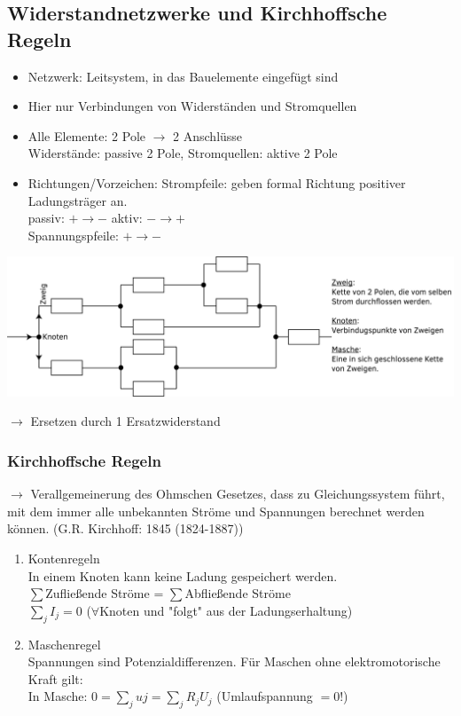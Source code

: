 \documentclass[11pt]{article}
\begin{document}
	\subsection{Widerstandnetzwerke und Kirchhoffsche Regeln}
	
	\begin{itemize}
		\item Netzwerk: Leitsystem, in das Bauelemente eingefügt sind
		\item Hier nur Verbindungen von Widerständen und Stromquellen
		\item Alle Elemente: 2 Pole $ \longrightarrow $ 2 Anschlüsse \\
		Widerstände: passive 2 Pole, Stromquellen: aktive 2 Pole
		\item Richtungen/Vorzeichen: Strompfeile: geben formal Richtung positiver Ladungsträger an. \\
		passiv: $ + \longrightarrow - $ \hspace{1cm} aktiv: $ - \longrightarrow + $ \\
		Spannungspfeile: $ + \longrightarrow - $
	\end{itemize}
	\begin{center}
		\includegraphics[width=1\linewidth]{skizzen/15/15_4-6/15_5B0}
	\end{center}

	$ \longrightarrow $ Ersetzen durch 1 Ersatzwiderstand
	
	\subsubsection{Kirchhoffsche Regeln}
	$ \longrightarrow $ Verallgemeinerung des Ohmschen Gesetzes, dass zu Gleichungssystem führt, mit dem immer alle unbekannten Ströme und Spannungen berechnet werden können. (G.R. Kirchhoff: 1845 (1824-1887))
	\begin{enumerate}
		\item Kontenregeln \\
		In einem Knoten kann keine Ladung gespeichert werden. \\
		$ \sum $Zufließende Ströme = $ \sum $Abfließende Ströme\\
		$ \sum_j I_j=0$ \hspace{1cm} ($ \forall $Knoten und "folgt" aus der Ladungserhaltung)
		\item Maschenregel \\
		Spannungen sind Potenzialdifferenzen. Für Maschen ohne elektromotorische Kraft gilt: \\
		In Masche: $ 0=\sum_j uj = \sum_j R_jU_j  $ (Umlaufspannung $ =0 $!)\\
	\end{enumerate}
	
\end{document}
